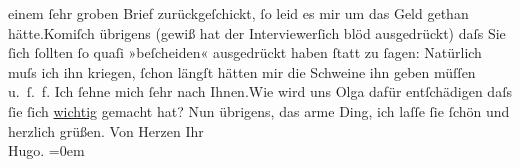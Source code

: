 \begin{ledgroupsized}[t]{13cm}
               einem ſehr groben Brief zurückgeſchickt, ſo leid es mir um das Geld gethan
                  hätte.\hspace*{1.5em}Komiſch übrigens (gewiß hat {\pb}der Interviewerſich blöd ausgedrückt) daſs Sie ſich ſollten ſo
               quaſi »beſcheiden« ausgedrückt haben ſtatt zu ſagen: Natürlich muſs ich ihn kriegen,
               ſchon längſt hätten mir die Schweine ihn geben müſſen u. ſ. f.\pend
           \pstart
           Ich ſehne mich ſehr {\pb}nach
                  Ihnen.\hspace*{1.5em}Wie wird uns Olga dafür entſchädigen daſs ſie ſich \uline{wichtig} gemacht hat? Nun übrigens, das arme Ding, ich laſſe ſie ſchön
               und herzlich grüßen.\pend
           \pstart
           Von Herzen Ihr{\\[\baselineskip]}\spacefill\mbox{Hugo.}\pend
           \leftskip=0em{}
         
         \endnumbering{}\end{ledgroupsized}  \newcommand{\dateiname}{L01753}\newcommand{\titel}{Hugo von Hofmannsthal an Arthur Schnitzler, [17. 1. 1908]}\newcommand{\editorInnen}{Martin Anton Müller und Gerd-Hermann Susen}
      